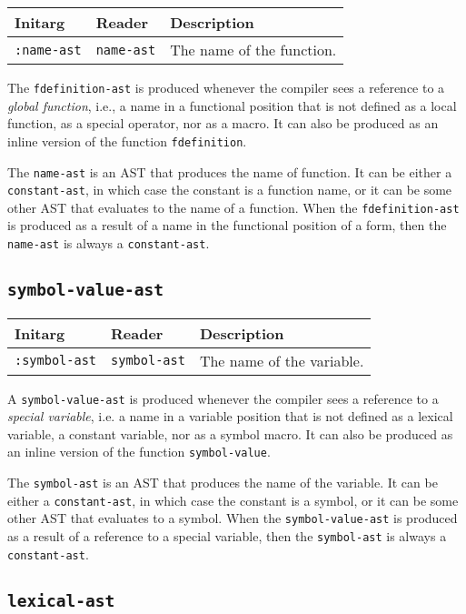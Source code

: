 \begin{tabular}{|l|l|l|}
\hline
Initarg & Reader & Description\\
\hline\hline
\texttt{:name-ast} & \texttt{name-ast} & The name of the function.\\  
\hline
\end{tabular}

The \texttt{fdefinition-ast} is produced whenever the compiler sees a
reference to a \emph{global function}, i.e., a name in a functional
position that is not defined as a local function, as a special
operator, nor as a macro.  It can also be produced as an inline
version of the function \texttt{fdefinition}.

The \texttt{name-ast} is an AST that produces the name of function.
It can be either a \texttt{constant-ast}, in which case the constant
is a function name, or it can be some other AST that evaluates to the
name of a function.  When the \texttt{fdefinition-ast} is produced as
a result of a name in the functional position of a form, then the
\texttt{name-ast} is always a \texttt{constant-ast}.

\subsection{\texttt{symbol-value-ast}}
\label{symbol-value-ast}

\begin{tabular}{|l|l|l|}
\hline
Initarg & Reader & Description\\
\hline\hline
\texttt{:symbol-ast} & \texttt{symbol-ast} & The name of the variable.\\  
\hline
\end{tabular}

A \texttt{symbol-value-ast} is produced whenever the compiler sees a
reference to a \emph{special variable}, i.e. a name in a variable
position that is not defined as a lexical variable, a constant
variable, nor as a symbol macro.  It can also be produced as an inline
version of the function \texttt{symbol-value}.

The \texttt{symbol-ast} is an AST that produces the name of the
variable.  It can be either a \texttt{constant-ast}, in which case the
constant is a symbol, or it can be some other AST that evaluates to a
symbol.  When the \texttt{symbol-value-ast} is produced as a result of
a reference to a special variable, then the \texttt{symbol-ast} is
always a \texttt{constant-ast}.


\subsection{\texttt{lexical-ast}}
\label{lexical-ast}

